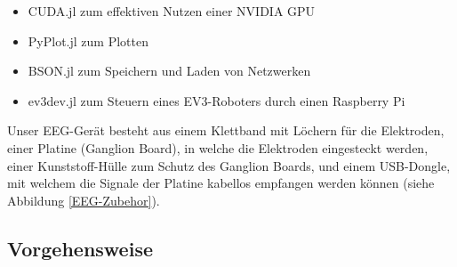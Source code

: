 \documentclass[11pt]{scrartcl}
\begin{document}
\begin{itemize}
\begin{itemize}
			\item CUDA.jl zum effektiven Nutzen einer NVIDIA GPU
				\cite{CUDA}
			
			\item PyPlot.jl zum Plotten
				\cite{pyplot}
			
			\item BSON.jl zum Speichern und Laden von Netzwerken
			
			\item ev3dev.jl zum Steuern eines EV3-Roboters durch einen Raspberry Pi
				\cite{ev3dev}
			
		\end{itemize}

	\end{itemize}

	\begin{figure}[h!]
	\end{figure}

	Unser EEG-Gerät besteht aus einem Klettband mit Löchern für die Elektroden, einer Platine (Ganglion Board), in welche die Elektroden eingesteckt werden, einer Kunststoff-Hülle zum Schutz des Ganglion Boards, und einem USB-Dongle, mit welchem die Signale der Platine kabellos empfangen werden können (siehe Abbildung \ref{EEG-Zubehor}).

	\subsection{Vorgehensweise}
\end{document}
